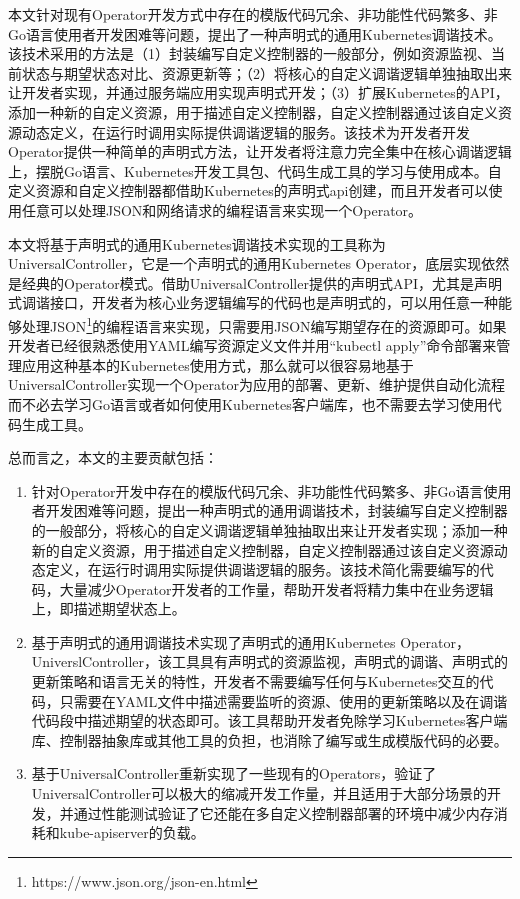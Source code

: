 \documentclass[macfonts,master]{njuthesis}
\begin{document}
本文针对现有Operator开发方式中存在的模版代码冗余、非功能性代码繁多、非Go语言使用者开发困难等问题，提出了一种声明式的通用Kubernetes调谐技术。该技术采用的方法是（1）封装编写自定义控制器的一般部分，例如资源监视、当前状态与期望状态对比、资源更新等；（2）将核心的自定义调谐逻辑单独抽取出来让开发者实现，并通过服务端应用实现声明式开发；（3）扩展Kubernetes的API，添加一种新的自定义资源，用于描述自定义控制器，自定义控制器通过该自定义资源动态定义，在运行时调用实际提供调谐逻辑的服务。该技术为开发者开发Operator提供一种简单的声明式方法，让开发者将注意力完全集中在核心调谐逻辑上，摆脱Go语言、Kubernetes开发工具包、代码生成工具的学习与使用成本。自定义资源和自定义控制器都借助Kubernetes的声明式api创建，而且开发者可以使用任意可以处理JSON和网络请求的编程语言来实现一个Operator。

本文将基于声明式的通用Kubernetes调谐技术实现的工具称为UniversalController，它是一个声明式的通用Kubernetes Operator，底层实现依然是经典的Operator模式。借助UniversalController提供的声明式API，尤其是声明式调谐接口，开发者为核心业务逻辑编写的代码也是声明式的，可以用任意一种能够处理JSON\footnote{https://www.json.org/json-en.html}的编程语言来实现，只需要用JSON编写期望存在的资源即可。如果开发者已经很熟悉使用YAML编写资源定义文件并用``kubectl apply''命令部署来管理应用这种基本的Kubernetes使用方式，那么就可以很容易地基于UniversalController实现一个Operator为应用的部署、更新、维护提供自动化流程而不必去学习Go语言或者如何使用Kubernetes客户端库，也不需要去学习使用代码生成工具。

总而言之，本文的主要贡献包括：

\begin{enumerate}
	\item 针对Operator开发中存在的模版代码冗余、非功能性代码繁多、非Go语言使用者开发困难等问题，提出一种声明式的通用调谐技术，封装编写自定义控制器的一般部分，将核心的自定义调谐逻辑单独抽取出来让开发者实现；添加一种新的自定义资源，用于描述自定义控制器，自定义控制器通过该自定义资源动态定义，在运行时调用实际提供调谐逻辑的服务。该技术简化需要编写的代码，大量减少Operator开发者的工作量，帮助开发者将精力集中在业务逻辑上，即描述期望状态上。
	\item 基于声明式的通用调谐技术实现了声明式的通用Kubernetes Operator，UniverslController，该工具具有声明式的资源监视，声明式的调谐、声明式的更新策略和语言无关的特性，开发者不需要编写任何与Kubernetes交互的代码，只需要在YAML文件中描述需要监听的资源、使用的更新策略以及在调谐代码段中描述期望的状态即可。该工具帮助开发者免除学习Kubernetes客户端库、控制器抽象库或其他工具的负担，也消除了编写或生成模版代码的必要。
	\item 基于UniversalController重新实现了一些现有的Operators，验证了UniversalController可以极大的缩减开发工作量，并且适用于大部分场景的开发，并通过性能测试验证了它还能在多自定义控制器部署的环境中减少内存消耗和kube-apiserver的负载。
\end{enumerate}
\end{document}
